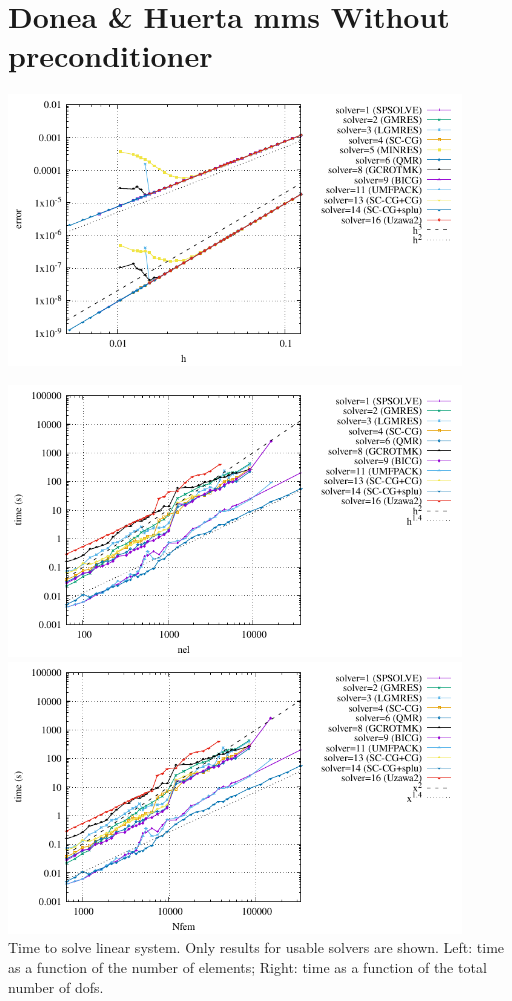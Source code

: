 \newpage
\section*{Donea \& Huerta mms Without preconditioner}

\begin{center}
\includegraphics[width=12cm]{python_codes/fieldstone_147/RESULTS/errors.pdf}
\end{center}

\begin{center}
\includegraphics[width=12cm]{python_codes/fieldstone_147/RESULTS/solve.pdf} \\
\includegraphics[width=12cm]{python_codes/fieldstone_147/RESULTS/solve2.pdf}\\
{\captionfont Time to solve linear system. Only results for usable solvers are shown. 
Left: time as a function of the number of elements; Right: 
time as a function of the total number of dofs.}
\end{center}

